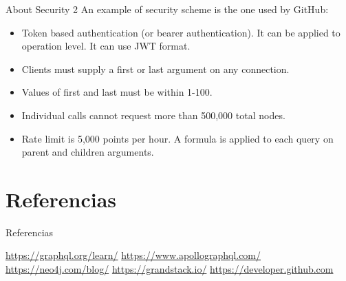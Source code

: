 \documentclass{beamer}
\begin{document}
\begin{frame}{About Security 2}
An example of security scheme is the one used by GitHub:
\begin{itemize}
\item Token based authentication (or bearer authentication). It can be applied to operation level. It can use JWT format.
\item Clients must supply a first or last argument on any connection.
\item Values of first and last must be within 1-100.
\item Individual calls cannot request more than 500,000 total nodes.
\item Rate limit is 5,000 points per hour. A formula is applied to each query on parent and children arguments.


\end{itemize} 
\end{frame}

\section{Referencias}
\begin{frame}{Referencias}
  \begin{thebibliography}{10} 	
  	\beamertemplatearticlebibitems
  	
  	   \url{https://graphql.org/learn/}		
  	\url{https://www.apollographql.com/}
  	\url{https://neo4j.com/blog/}
  	\url{https://grandstack.io/}
  	\url{https://developer.github.com}
  \end{thebibliography}
\end{frame}
\end{document}
